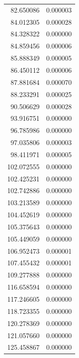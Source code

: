 \begin{longtable}{rr}
82.650086 & 0.000003 \\
84.012305 & 0.000028 \\
84.328322 & 0.000000 \\
84.859456 & 0.000006 \\
85.888349 & 0.000005 \\
86.450112 & 0.000006 \\
87.881684 & 0.000070 \\
88.233291 & 0.000025 \\
90.506629 & 0.000028 \\
93.916751 & 0.000000 \\
96.785986 & 0.000000 \\
97.035806 & 0.000003 \\
98.411971 & 0.000005 \\
102.072555 & 0.000000 \\
102.425231 & 0.000000 \\
102.742886 & 0.000000 \\
103.213589 & 0.000000 \\
104.452619 & 0.000000 \\
105.375643 & 0.000000 \\
105.449059 & 0.000000 \\
106.952473 & 0.000001 \\
107.455432 & 0.000001 \\
109.277888 & 0.000000 \\
116.658594 & 0.000000 \\
117.246605 & 0.000000 \\
118.723355 & 0.000000 \\
120.278369 & 0.000000 \\
121.057660 & 0.000000 \\
125.458867 & 0.000000 \\
\end{longtable}
